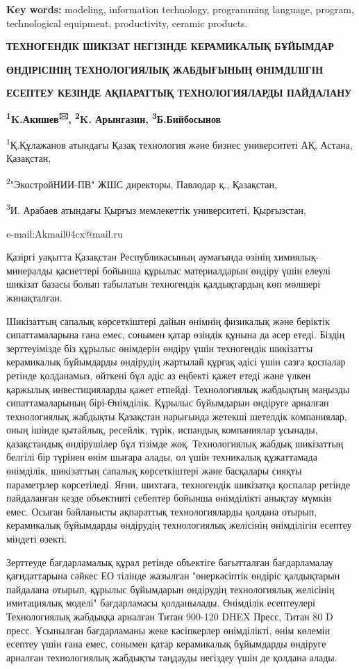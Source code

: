{\bfseries Key words:} modeling, information technology, programming
language, program, technological equipment, productivity, ceramic
products.

{\bfseries ТЕХНОГЕНДІК ШИКІЗАТ НЕГІЗІНДЕ КЕРАМИКАЛЫҚ БҰЙЫМДАР}

{\bfseries ӨНДІРІСІНІҢ ТЕХНОЛОГИЯЛЫҚ ЖАБДЫҒЫНЫҢ ӨНІМДІЛІГІН}

{\bfseries ЕСЕПТЕУ КЕЗІНДЕ АҚПАРАТТЫҚ ТЕХНОЛОГИЯЛАРДЫ ПАЙДАЛАНУ}

{\bfseries \textsuperscript{1}K.Акишев\textsuperscript{🖂},
\textsuperscript{2}K. Арынгазин, \textsuperscript{3}Б.Бийбосынов}

\textsuperscript{1}Қ.Құлажанов атындағы Қазақ технология және бизнес
университеті АҚ, Астана, Қазақстан,

\textsuperscript{2}"ЭкостройНИИ-ПВ" ЖШС директоры, Павлодар қ.,
Қазақстан,

\textsuperscript{3}И. Арабаев атындағы Қырғыз мемлекеттік университеті,
Қырғызстан,

e-mail:Akmail04cx@mail.ru

Қазіргі уақытта Қазақстан Республикасының аумағында өзінің
химиялық-минералды қасиеттері бойынша құрылыс материалдарын өндіру үшін
елеулі шикізат базасы болып табылатын техногендік қалдықтардың көп
мөлшері жинақталған.

Шикізаттың сапалық көрсеткіштері дайын өнімнің физикалық және беріктік
сипаттамаларына ғана емес, сонымен қатар өзіндік құнына да әсер етеді.
Біздің зерттеуімізде біз құрылыс өнімдерін өндіру үшін техногендік
шикізатты керамикалық бұйымдарды өндірудің жартылай құрғақ әдісі үшін
сазға қоспалар ретінде қолданамыз, өйткені бұл әдіс аз еңбекті қажет
етеді және үлкен қаржылық инвестицияларды қажет етпейді. Технологиялық
жабдықтың маңызды сипаттамаларының бірі-Өнімділік. Құрылыс бұйымдарын
өндіруге арналған технологиялық жабдықты Қазақстан нарығында жетекші
шетелдік компаниялар, оның ішінде қытайлық, ресейлік, түрік, испандық
компаниялар ұсынады, қазақстандық өндірушілер бұл тізімде жоқ.
Технологиялық жабдық шикізаттың белгілі бір түрінен өнім шығара алады,
ол үшін техникалық құжаттамада өнімділік, шикізаттың сапалық
көрсеткіштері және басқалары сияқты параметрлер көрсетіледі. Яғни,
шихтаға, техногендік шикізатқа қоспалар ретінде пайдаланған кезде
объективті себептер бойынша өнімділікті анықтау мүмкін емес. Осыған
байланысты ақпараттық технологияларды қолдана отырып, керамикалық
бұйымдарды өндірудің технологиялық желісінің өнімділігін есептеу міндеті
өзекті.

Зерттеуде бағдарламалық құрал ретінде объектіге бағытталған
бағдарламалау қағидаттарына сәйкес ЕО тілінде жазылған "өнеркәсіптік
өндіріс қалдықтарын пайдалана отырып, құрылыс бұйымдарын өндірудің
технологиялық желісінің имитациялық моделі" бағдарламасы қолданылады.
Өнімділік есептеулері Технологиялық жабдыққа арналған Титан 900-120 DHEX
Пресс, Титан 80 D пресс. Ұсынылған бағдарламаны жеке кәсіпкерлер
өнімділікті, өнім көлемін есептеу үшін ғана емес, сонымен қатар
керамикалық бұйымдарды өндіруге арналған технологиялық жабдықты таңдауды
негіздеу үшін де қолдана алады.

